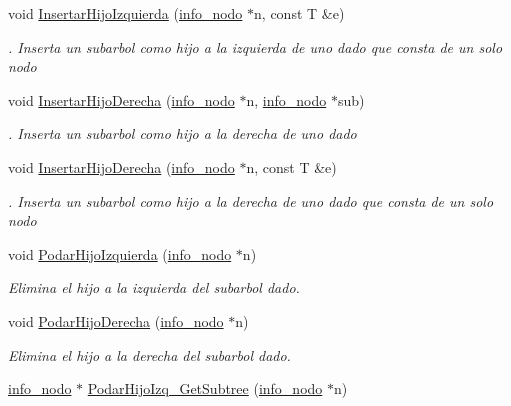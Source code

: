 \begin{DoxyCompactItemize}
void \hyperlink{classArbolBinario_a87341ffccfe5ef304783c70adf86238d}{Insertar\+Hijo\+Izquierda} (\hyperlink{structArbolBinario_1_1info__nodo}{info\+\_\+nodo} $\ast$n, const T \&e)
\begin{DoxyCompactList}\small\item\em . Inserta un subarbol como hijo a la izquierda de uno dado que consta de un solo nodo \end{DoxyCompactList}\item 
void \hyperlink{classArbolBinario_a8f4971f20eb2a059b9b1ae117e7fe912}{Insertar\+Hijo\+Derecha} (\hyperlink{structArbolBinario_1_1info__nodo}{info\+\_\+nodo} $\ast$n, \hyperlink{structArbolBinario_1_1info__nodo}{info\+\_\+nodo} $\ast$sub)
\begin{DoxyCompactList}\small\item\em . Inserta un subarbol como hijo a la derecha de uno dado \end{DoxyCompactList}\item 
void \hyperlink{classArbolBinario_ad625a7ef38fa30f0420b101e1655b4aa}{Insertar\+Hijo\+Derecha} (\hyperlink{structArbolBinario_1_1info__nodo}{info\+\_\+nodo} $\ast$n, const T \&e)
\begin{DoxyCompactList}\small\item\em . Inserta un subarbol como hijo a la derecha de uno dado que consta de un solo nodo \end{DoxyCompactList}\item 
void \hyperlink{classArbolBinario_a289083bf048ca95e482264ccf0ce4f42}{Podar\+Hijo\+Izquierda} (\hyperlink{structArbolBinario_1_1info__nodo}{info\+\_\+nodo} $\ast$n)
\begin{DoxyCompactList}\small\item\em Elimina el hijo a la izquierda del subarbol dado. \end{DoxyCompactList}\item 
void \hyperlink{classArbolBinario_afe7738999aed926e580faf68078bbe46}{Podar\+Hijo\+Derecha} (\hyperlink{structArbolBinario_1_1info__nodo}{info\+\_\+nodo} $\ast$n)
\begin{DoxyCompactList}\small\item\em Elimina el hijo a la derecha del subarbol dado. \end{DoxyCompactList}\item 
\hyperlink{structArbolBinario_1_1info__nodo}{info\+\_\+nodo} $\ast$ \hyperlink{classArbolBinario_a307e743bfe1264ff6cba2d484f0eb578}{Podar\+Hijo\+Izq\+\_\+\+Get\+Subtree} (\hyperlink{structArbolBinario_1_1info__nodo}{info\+\_\+nodo} $\ast$n)

\end{DoxyCompactItemize}
